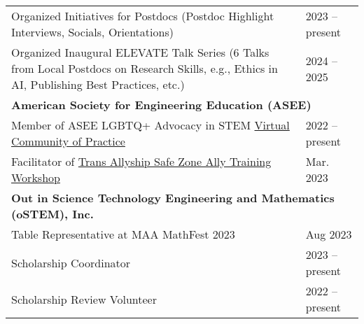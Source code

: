 \documentclass[letterpaper,11pt]{article}
\begin{document}
\begin{longtable}{@{}p{}l@{}}
  \hspace{3mm} Organized Initiatives for Postdocs (Postdoc Highlight Interviews, Socials, Orientations)                                                                                                       & 2023 -- present  \\
  \hspace{3mm} Organized Inaugural ELEVATE Talk Series (6 Talks from Local Postdocs on Research Skills, e.g., Ethics in AI, Publishing Best Practices, etc.)                                                   & 2024 -- 2025     \\ [4pt]
  \multicolumn{2}{l}{\hspace{-3mm} \bf{American Society for Engineering Education (ASEE)}}                                                                                                                                           \\
  \hspace{3mm} Member of ASEE LGBTQ+ Advocacy in STEM \href{https://lgbtq.asee.org/our-community/}{Virtual Community of Practice}                                                                                 & 2022 -- present  \\
  \hspace{3mm} Facilitator of \href{https://lgbtq.asee.org/ally-training/online-workshops/#:~:text=Safe\%20Zone\%20Ally\%20Training\%3A\%20Tans\%20Allyship}{Trans Allyship Safe Zone Ally Training Workshop}     & Mar. 2023        \\ [4pt]
  \multicolumn{2}{l}{\hspace{-3mm} \bf{Out in Science Technology Engineering and Mathematics (oSTEM), Inc.}}                                                                                                                         \\
  \hspace{3mm} Table Representative at MAA MathFest 2023                                                                                                                                                          & Aug 2023         \\
  \hspace{3mm} Scholarship Coordinator                                                                                                                                                                            & 2023 -- present  \\
  \hspace{3mm} Scholarship Review Volunteer                                                                                                                                                                       & 2022 -- present  \\

\end{longtable}
\end{document}
